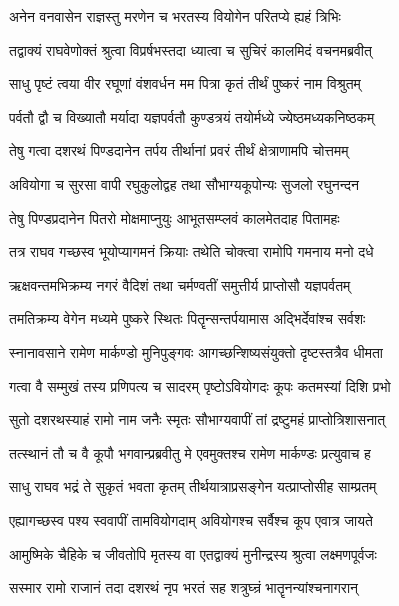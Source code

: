 \twolineshloka
{अनेन वनवासेन राज्ञस्तु मरणेन च}
{भरतस्य वियोगेन परितप्ये ह्यहं त्रिभिः} %

\twolineshloka
{तद्वाक्यं राघवेणोक्तं श्रुत्वा विप्रर्षभस्तदा}
{ध्यात्वा च सुचिरं कालमिदं वचनमब्रवीत्} %



\twolineshloka
{साधु पृष्टं त्वया वीर रघूणां वंशवर्धन}
{मम पित्रा कृतं तीर्थं पुष्करं नाम विश्रुतम्} %

\twolineshloka
{पर्वतौ द्वौ च विख्यातौ मर्यादा यज्ञपर्वतौ}
{कुण्डत्रयं तयोर्मध्ये ज्येष्ठमध्यकनिष्ठकम्} %

\twolineshloka
{तेषु गत्वा दशरथं पिण्डदानेन तर्पय}
{तीर्थानां प्रवरं तीर्थं क्षेत्राणामपि चोत्तमम्} %

\twolineshloka
{अवियोगा च सुरसा वापी रघुकुलोद्वह}
{तथा सौभाग्यकूपोन्यः सुजलो रघुनन्दन} %

\twolineshloka
{तेषु पिण्डप्रदानेन पितरो मोक्षमाप्नुयुः}
{आभूतसम्प्लवं कालमेतदाह पितामहः} %

\twolineshloka
{तत्र राघव गच्छस्व भूयोप्यागमनं क्रियाः}
{तथेति चोक्त्वा रामोपि गमनाय मनो दधे} %

\twolineshloka
{ऋक्षवन्तमभिक्रम्य नगरं वैदिशं तथा}
{चर्मण्वतीं समुत्तीर्य प्राप्तोसौ यज्ञपर्वतम्} %

\twolineshloka
{तमतिक्रम्य वेगेन मध्यमे पुष्करे स्थितः}
{पितॄन्सन्तर्पयामास अद्भिर्देवांश्च सर्वशः} %

\twolineshloka
{स्नानावसाने रामेण मार्कण्डो मुनिपुङ्गवः}
{आगच्छन्शिष्यसंयुक्तो दृष्टस्तत्रैव धीमता} %

\twolineshloka
{गत्वा वै सम्मुखं तस्य प्रणिपत्य च सादरम्}
{पृष्टोऽवियोगदः कूपः कतमस्यां दिशि प्रभो} %

\twolineshloka
{सुतो दशरथस्याहं रामो नाम जनैः स्मृतः}
{सौभाग्यवापीं तां द्रष्टुमहं प्राप्तोत्रिशासनात्} %

\twolineshloka
{तत्स्थानं तौ च वै कूपौ भगवान्प्रब्रवीतु मे}
{एवमुक्तश्च रामेण मार्कण्डः प्रत्युवाच ह} %

\twolineshloka
{साधु राघव भद्रं ते सुकृतं भवता कृतम्}
{तीर्थयात्राप्रसङ्गेन यत्प्राप्तोसीह साम्प्रतम्} %

\twolineshloka
{एह्यागच्छस्व पश्य स्ववापीं तामवियोगदाम्}
{अवियोगश्च सर्वैश्च कूप एवात्र जायते} %

\twolineshloka
{आमुष्मिके चैहिके च जीवतोपि मृतस्य वा}
{एतद्वाक्यं मुनीन्द्रस्य श्रुत्वा लक्ष्मणपूर्वजः} %

\twolineshloka
{सस्मार रामो राजानं तदा दशरथं नृप}
{भरतं सह शत्रुघ्न्रं भातॄनन्यांश्चनागरान्} %

